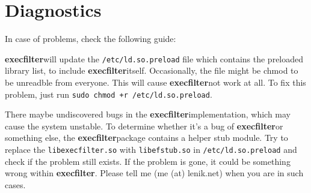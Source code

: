 \documentclass[hyperref, bookmark]{z-article}
\newcommand\code[1]{\texttt{#1}}
\newcommand\xfilt{\textbf{execfilter}}
\begin{document}
\section {Diagnostics}

In case of problems, check the following guide:

\xfilt will update the \code{/etc/ld.so.preload} file which contains the
preloaded library list, to include \xfilt itself. Occasionally, the file might
be chmod to be unreadble from everyone.  This will cause \xfilt not work at
all. To fix this problem, just run \code{sudo chmod +r /etc/ld.so.preload}.

There maybe undiscovered bugs in the \xfilt implementation, which may cause the
system unstable.  To determine whether it's a bug of \xfilt or something else,
the \xfilt package contains a helper stub module.  Try to replace the
\code{libexecfilter.so} with \code{libefstub.so} in \code{/etc/ld.so.preload}
and check if the problem still exists.  If the problem is gone, it could be
something wrong within \xfilt.  Please tell me (me (at) lenik.net) when you are
in such cases.

\appendix
\end{document}
